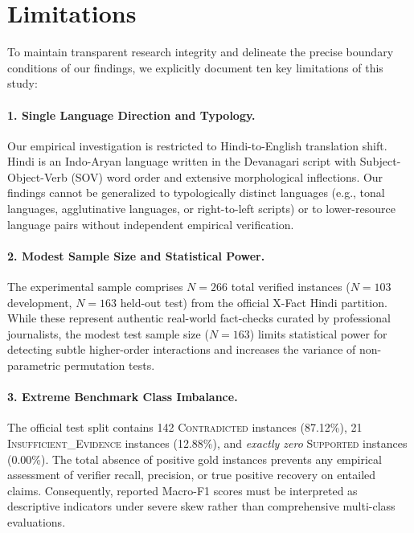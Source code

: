 \section{Limitations}
\label{sec:limitations}

To maintain transparent research integrity and delineate the precise boundary conditions of our findings, we explicitly document ten key limitations of this study:

\paragraph{1. Single Language Direction and Typology.}
Our empirical investigation is restricted to Hindi-to-English translation shift. Hindi is an Indo-Aryan language written in the Devanagari script with Subject-Object-Verb (SOV) word order and extensive morphological inflections. Our findings cannot be generalized to typologically distinct languages (e.g., tonal languages, agglutinative languages, or right-to-left scripts) or to lower-resource language pairs without independent empirical verification.

\paragraph{2. Modest Sample Size and Statistical Power.}
The experimental sample comprises $N=266$ total verified instances ($N=103$ development, $N=163$ held-out test) from the official X-Fact Hindi partition. While these represent authentic real-world fact-checks curated by professional journalists, the modest test sample size ($N=163$) limits statistical power for detecting subtle higher-order interactions and increases the variance of non-parametric permutation tests.

\paragraph{3. Extreme Benchmark Class Imbalance.}
The official test split contains 142 \textsc{Contradicted} instances (87.12\%), 21 \textsc{Insufficient\_Evidence} instances (12.88\%), and \emph{exactly zero} \textsc{Supported} instances (0.00\%). The total absence of positive gold instances prevents any empirical assessment of verifier recall, precision, or true positive recovery on entailed claims. Consequently, reported Macro-F1 scores must be interpreted as descriptive indicators under severe skew rather than comprehensive multi-class evaluations.


